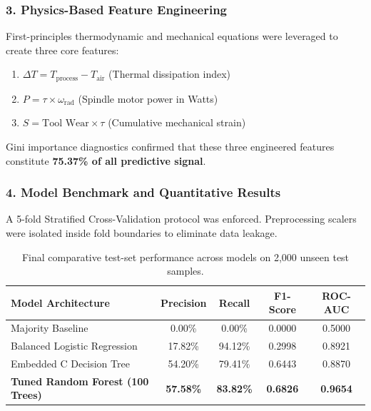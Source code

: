 \subsubsection*{3. Physics-Based Feature Engineering}
First-principles thermodynamic and mechanical equations were leveraged to create three core features:
\begin{enumerate}
    \item $\Delta T = T_{\text{process}} - T_{\text{air}}$ (Thermal dissipation index)
    \item $P = \tau \times \omega_{\text{rad}}$ (Spindle motor power in Watts)
    \item $S = \text{Tool Wear} \times \tau$ (Cumulative mechanical strain)
\end{enumerate}
Gini importance diagnostics confirmed that these three engineered features constitute \textbf{75.37\% of all predictive signal}.

\subsubsection*{4. Model Benchmark and Quantitative Results}
A 5-fold Stratified Cross-Validation protocol was enforced. Preprocessing scalers were isolated inside fold boundaries to eliminate data leakage.

\begin{table}[htbp]
\centering
\small
\begin{tabular}{lcccc}
\toprule
\textbf{Model Architecture} & \textbf{Precision} & \textbf{Recall} & \textbf{F1-Score} & \textbf{ROC-AUC} \\
\midrule
Majority Baseline & 0.00\% & 0.00\% & 0.0000 & 0.5000 \\
Balanced Logistic Regression & 17.82\% & 94.12\% & 0.2998 & 0.8921 \\
Embedded C Decision Tree & 54.20\% & 79.41\% & 0.6443 & 0.8870 \\
\textbf{Tuned Random Forest (100 Trees)} & \textbf{57.58\%} & \textbf{83.82\%} & \textbf{0.6826} & \textbf{0.9654} \\
\bottomrule
\end{tabular}
\caption{Final comparative test-set performance across models on 2,000 unseen test samples.}\label{tab:final_results}
\end{table}

